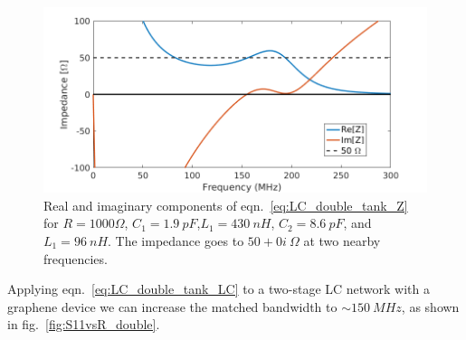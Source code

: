 \begin{figure}
\centering
\includegraphics[width=120mm]{figures/Johnson_noise_thermometry/Z_doubleTank.png}
\caption{Real and imaginary components of eqn.~\ref{eq:LC_double_tank_Z} for $R=1000\Omega$, $C_1=1.9~pF$,$L_1=430~nH$, $C_2=8.6~pF$, and $L_1=96~nH$. The impedance goes to $50+0i~\Omega$ at two nearby frequencies.}
\label{fig:LC_double_tank_Z}
\end{figure}
Applying eqn.~\ref{eq:LC_double_tank_LC} to a two-stage LC network with a graphene device we can increase the matched bandwidth to ${\sim}150~MHz$, as shown in fig.~\ref{fig:S11vsR_double}.

